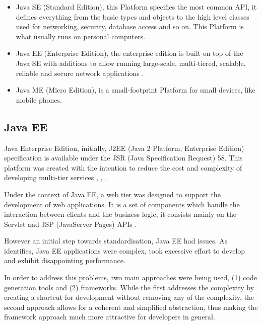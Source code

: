\begin{itemize}
	\item Java SE (Standard Edition), this Platform specifies the most common API, it defines everything from the basic types and objects to the high level classes used for networking, security, database access and so on. This Platform is what usually runs on personal computers.
	\item Java EE (Enterprise Edition), the enterprise edition is built on top of the Java SE with additions to allow running large-scale, multi-tiered, scalable, reliable and secure network applications \cite{OracleJavaPlatform}.
	\item Java ME (Micro Edition), is a small-footprint Platform for small devices, like mobile phones.
\end{itemize}

\subsection{Java EE}

Java Enterprise Edition, initially, J2EE (Java 2 Platform, Enterprise Edition) specification is available under the JSR (Java Specification Request) 58. This platform was created with the intention to reduce the cost and complexity of developing multi-tier services \cite{SunMicrosystemsJSRSpecification}, \cite{SunMicrosystems200JavaGuide}, \cite{Bloch2008EffectiveSeries}. 

Under the context of Java EE, a web tier was designed to support the development of web applications. It is a set of components which handle the interaction between clients and the business logic, it consists mainly on the Servlet and JSP (JavaServer Pages) APIs \cite{Mordani2003JSRSpecification, Mordan2009JSRSpecification, waiChan2013JSRSpecification}.

However an initial step towards standardisation, Java EE had issues. As \cite{Johnson2005ProfessionalFramework} identifies, Java EE applications were complex, took excessive effort to develop and exhibit disappointing performance.

In order to address this problems, two main approaches were being used, (1) code generation tools and (2) frameworks. While the first addresses the complexity by creating a shortcut for development without removing any of the complexity, the second approach allows for a coherent and simplified abstraction, thus making the framework approach much more attractive for developers in general.

